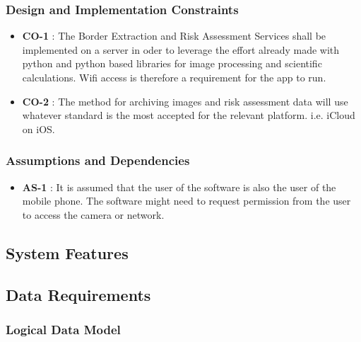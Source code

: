         \subsubsection{Design and Implementation Constraints}

                    \noindent
                    \begin{itemize}[leftmargin=*]
                        \item[]  \textbf{CO-1} : The Border Extraction and Risk Assessment Services shall be implemented on a server in oder to leverage the effort already made with python and python based libraries for image processing and scientific calculations. Wifi access is therefore a requirement for the app to run.
                        \item[]  \textbf{CO-2} : The method for archiving images and risk assessment data will use whatever standard is the most accepted for the relevant platform. i.e. iCloud on iOS.


                    \end{itemize}


        \subsubsection{Assumptions and Dependencies}

                    \noindent
                    \begin{itemize}[leftmargin=*]
                        \item[]  \textbf{AS-1} : It is assumed that the user of the software is also the user of the mobile phone. The software might need to request permission from the user to access the camera or network.

                    \end{itemize}


    \subsection{System Features}
        

    \subsection{Data Requirements}
        \subsubsection{Logical Data Model}
